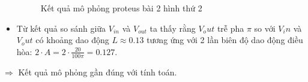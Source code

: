 \begin{itemize}
\begin{figure}[H]
                    \caption{Kết quả mô phỏng proteus bài 2 hình thứ 2}
                \end{figure}
                \item Từ kết quả so sánh giữa $V_{in}$ và $V_{out}$ ta thấy rằng $V_out$ trễ pha $\pi$ so với $V_in$ và $V_out$ có khoảng dao động $L \approx 0.13$ tương ứng với 2 lần biên độ dao động điều hòa: $2 \cdot A = 2 \cdot \frac{20}{100 \pi} = 0.127$.
            \end{itemize}
            \hspace*{0.6cm}$\Rightarrow$ Kết quả mô phỏng gần đúng với tính toán.



            